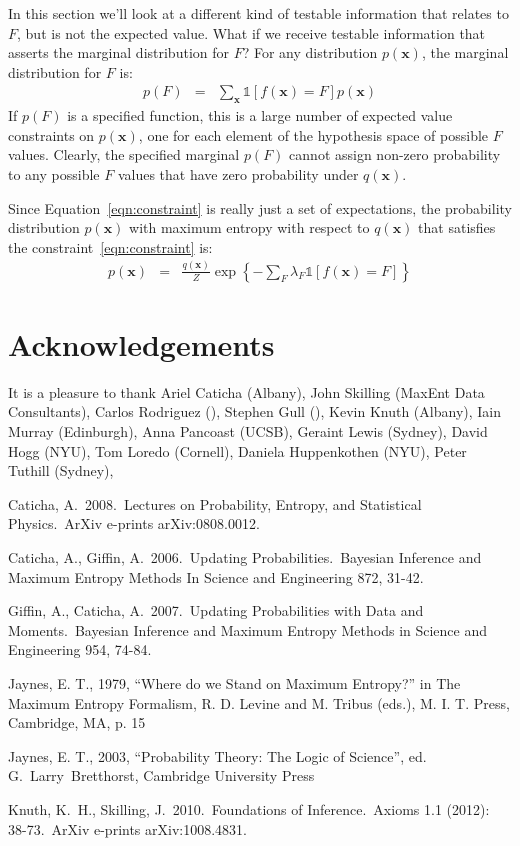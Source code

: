 \documentclass[letterpaper, 11pt]{article}
\newcommand{\xx}{\boldsymbol{x}}
\begin{document}
In this section we'll look at a different kind of testable information that
relates to $F$, but is not the expected value. What if we receive testable
information that asserts the marginal distribution for $F$?
For any distribution $p(\xx)$, the marginal distribution for $F$ is:
\begin{eqnarray}
p(F) &=& \sum_{\xx}\mathds{1}\left[f(\xx) = F\right]p(\xx)\label{eqn:constraint}
\end{eqnarray}
If $p(F)$ is a specified function, this is a large number of expected
value constraints on $p(\xx)$, one for each element of the hypothesis space
of possible $F$ values. Clearly, the specified marginal $p(F)$ cannot assign
non-zero probability to any possible $F$ values that have zero probability
under $q(\xx)$.

Since Equation~\ref{eqn:constraint} is really just a set of expectations,
the probability distribution
$p(\xx)$ with maximum entropy with respect to $q(\xx)$ that satisfies the
constraint~\ref{eqn:constraint} is:
\begin{eqnarray}
p(\xx) &=& \frac{q(\xx)}{Z}\exp\left\{-\sum_F \lambda_F \mathds{1}
\left[f(\xx) = F\right]  \right\}
\end{eqnarray}


\section*{Acknowledgements}
It is a pleasure to thank
Ariel Caticha (Albany),
John Skilling (MaxEnt Data Consultants),
Carlos Rodriguez (),
Stephen Gull (),
Kevin Knuth (Albany),
Iain Murray (Edinburgh),
Anna Pancoast (UCSB),
Geraint Lewis (Sydney),
David Hogg (NYU),
Tom Loredo (Cornell),
Daniela Huppenkothen (NYU),
Peter Tuthill (Sydney),


\begin{thebibliography}{}
 Caticha, A.\ 2008.\ Lectures 
on Probability, Entropy, and Statistical Physics.\ ArXiv e-prints 
arXiv:0808.0012. 

 Caticha, A., 
Giffin, A.\ 2006.\ Updating Probabilities.\ Bayesian Inference and Maximum 
Entropy Methods In Science and Engineering 872, 31-42.

 Giffin, A., 
Caticha, A.\ 2007.\ Updating Probabilities with Data and Moments.\ Bayesian 
Inference and Maximum Entropy Methods in Science and Engineering 954, 
74-84.

 Jaynes, E. T., 1979, ``Where do we Stand on Maximum Entropy?'' in The Maximum Entropy Formalism, R. D. Levine and M. Tribus (eds.), M. I. T. Press, Cambridge, MA, p. 15

 Jaynes, E. T., 2003, ``Probability Theory:
The Logic of Science'', ed. G.~Larry~Bretthorst, Cambridge University Press

 Knuth, K.~H., 
Skilling, J.\ 2010.\ Foundations of Inference.\
Axioms 1.1 (2012): 38-73.\
ArXiv e-prints arXiv:1008.4831. 
\end{thebibliography}
\end{document}
